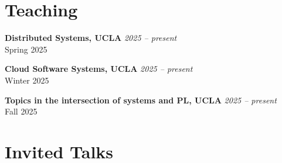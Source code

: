\documentclass[margin]{res}
\begin{document}
\begin{resume}


\section{Teaching}
\hypertarget{sec:teaching}{}

\textbf{Distributed Systems, UCLA} \hfill {\em 2025 -- present} \\
Spring 2025

\textbf{Cloud Software Systems, UCLA} \hfill {\em 2025 -- present} \\
Winter 2025

\textbf{Topics in the intersection of systems and PL, UCLA} \hfill {\em 2025 -- present} \\
Fall 2025






\section{Invited Talks}
\hypertarget{sec:talks}{}


\end{resume}
\end{document}
